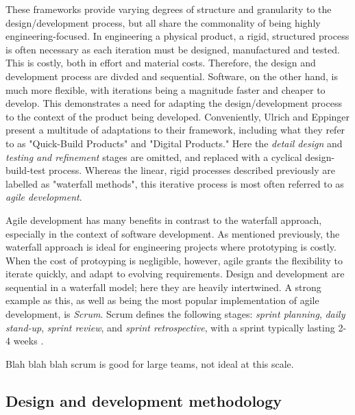 These frameworks provide varying degrees of structure and granularity to the design/development process, but all share the commonality of being highly engineering-focused. In engineering a physical product, a rigid, structured process is often necessary as each iteration must be designed, manufactured and tested. This is costly, both in effort and material costs. Therefore, the design and development process are divded and sequential. Software, on the other hand, is much more flexible, with iterations being a magnitude faster and cheaper to develop. This demonstrates a need for adapting the design/development process to the context of the product being developed. Conveniently, Ulrich and Eppinger present a multitude of adaptations to their framework, including what they refer to as "Quick-Build Products" and "Digital Products." Here the \textit{detail design} and \textit{testing and refinement} stages are omitted, and replaced with a cyclical design-build-test process. Whereas the linear, rigid processes described previously are labelled as "waterfall methods", this iterative process is most often referred to as \textit{agile development}.

Agile development has many benefits in contrast to the waterfall approach, especially in the context of software development. As mentioned previously, the waterfall approach is ideal for engineering projects where prototyping is costly. When the cost of protoyping is negligible, however, agile grants the flexibility to iterate quickly, and adapt to evolving requirements. Design and development are sequential in a waterfall model; here they are heavily intertwined. A strong example as this, as well as being the most popular implementation of agile development, is \textit{Scrum}. Scrum defines the following stages: \textit{sprint planning}, \textit{daily stand-up}, \textit{sprint review}, and \textit{sprint retrospective}, with a sprint typically lasting 2-4 weeks \cite{scrum}.

Blah blah blah scrum is good for large teams, not ideal at this scale.

\subsection{Design and development methodology}